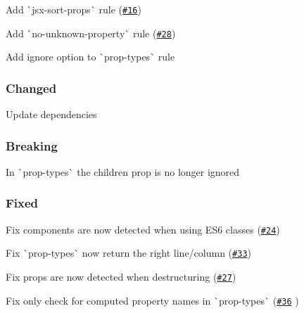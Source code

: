 \begin{DoxyItemize}
\item Add \`{}jsx-\/sort-\/props\`{} rule (\href{https://github.com/yannickcr/eslint-plugin-react/issues/16}{\tt \#16})
\item Add \`{}no-\/unknown-\/property\`{} rule (\href{https://github.com/yannickcr/eslint-plugin-react/issues/28}{\tt \#28})
\item Add ignore option to \`{}prop-\/types\`{} rule
\end{DoxyItemize}

\subsubsection*{Changed}


\begin{DoxyItemize}
\item Update dependencies
\end{DoxyItemize}

\subsubsection*{Breaking}


\begin{DoxyItemize}
\item In \`{}prop-\/types\`{} the children prop is no longer ignored
\end{DoxyItemize}

\subsubsection*{Fixed}


\begin{DoxyItemize}
\item Fix components are now detected when using E\+S6 classes (\href{https://github.com/yannickcr/eslint-plugin-react/issues/24}{\tt \#24})
\item Fix \`{}prop-\/types\`{} now return the right line/column (\href{https://github.com/yannickcr/eslint-plugin-react/issues/33}{\tt \#33})
\item Fix props are now detected when destructuring (\href{https://github.com/yannickcr/eslint-plugin-react/issues/27}{\tt \#27})
\item Fix only check for computed property names in \`{}prop-\/types\`{} (\href{https://github.com/yannickcr/eslint-plugin-react/pull/36}{\tt \#36} )
\end{DoxyItemize}

